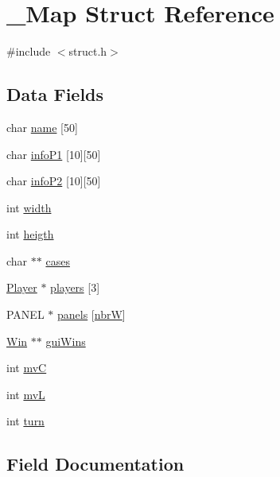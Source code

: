 \hypertarget{struct___map}{}\section{\+\_\+\+Map Struct Reference}
\label{struct___map}


{\ttfamily \#include $<$struct.\+h$>$}

\subsection*{Data Fields}
\begin{DoxyCompactItemize}
\item 
char \hyperlink{struct___map_ae5cb967283dbbdf75cb2032c1fa08fee}{name} \mbox{[}50\mbox{]}
\item 
char \hyperlink{struct___map_abd5a12f6d08d1da5d84e9142bcef5d9a}{info\+P1} \mbox{[}10\mbox{]}\mbox{[}50\mbox{]}
\item 
char \hyperlink{struct___map_a7918e7b9cb5d1890b8b6f01464a40e25}{info\+P2} \mbox{[}10\mbox{]}\mbox{[}50\mbox{]}
\item 
int \hyperlink{struct___map_a2474a5474cbff19523a51eb1de01cda4}{width}
\item 
int \hyperlink{struct___map_ae951a64b5603fdb0385b729946d1ebe1}{heigth}
\item 
char $\ast$$\ast$ \hyperlink{struct___map_a601e32b61d466f9df86e0fbc527472bf}{cases}
\item 
\hyperlink{struct_8h_af30e2030635a69690f85e48bc6ef202f}{Player} $\ast$ \hyperlink{struct___map_a48395d86670996c0e7144aff32feb7be}{players} \mbox{[}3\mbox{]}
\item 
P\+A\+N\+EL $\ast$ \hyperlink{struct___map_a5b6cf16adf92bcc75c0341ca682861d8}{panels} \mbox{[}\hyperlink{struct_8h_a30565ba468295703d7e04c7676643a4f}{nbrW}\mbox{]}
\item 
\hyperlink{struct_8h_adf6d865a38ae98af7b316588c8737f7a}{Win} $\ast$$\ast$ \hyperlink{struct___map_a81c46208e94d18eaf33350342c9051f1}{gui\+Wins}
\item 
int \hyperlink{struct___map_a23569f3884fe223e40739ce644769816}{mvC}
\item 
int \hyperlink{struct___map_a610a529d29e0a116ba9b47eacecbb962}{mvL}
\item 
int \hyperlink{struct___map_aaefa47f4fdf865c2358c22b542a993e4}{turn}
\end{DoxyCompactItemize}


\subsection{Field Documentation}
